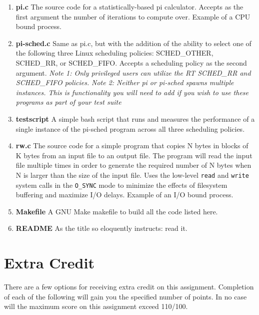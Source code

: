 \documentclass[12pt]{article}
\begin{document}
\begin{enumerate}

\item {\bf pi.c} The source code for a statistically-based pi
  calculator. Accepts as the first argument the number of iterations to
  compute over. Example of a CPU bound process.

\item {\bf pi-sched.c} Same as pi.c, but with the addition of the
  ability to select one of the following three Linux scheduling
  policies: SCHED\_OTHER, SCHED\_RR, or SCHED\_FIFO. Accepts a scheduling
  policy as the second argument.
\emph{Note 1: Only privileged users can
  utilize the RT SCHED\_RR and SCHED\_FIFO policies.}
\emph{Note 2:
    Neither pi or pi-sched spawns multiple instances. This is
    functionality you will need to add if you wish to use these
    programs as part of your test suite}

\item {\bf testscript} A simple bash script that runs and measures the
  performance of a single instance of the pi-sched program across all
  three scheduling policies.

\item {\bf rw.c} The source code for a simple program that copies N
  bytes in blocks of K bytes
  from an input file to an output file. The program will read the input
  file multiple times in order to generate the required number of N
  bytes when N is larger than the size of the input file. Uses the
  low-level \texttt{read} and \texttt{write} system calls
  in the \texttt{O\_SYNC}
  mode to minimize the effects of filesystem buffering and maximize
  I/O delays. Example of an I/O bound process.

\item {\bf Makefile} A GNU Make makefile to build all the code listed
  here.

\item {\bf README} As the title so eloquently instructs: read it.

\end{enumerate}

\section{Extra Credit}

There are a few options for receiving extra credit on this
assignment. Completion of each of the following will gain you the
specified number of points. In no case will the maximum score on
this assignment exceed 110/100.
\end{document}
